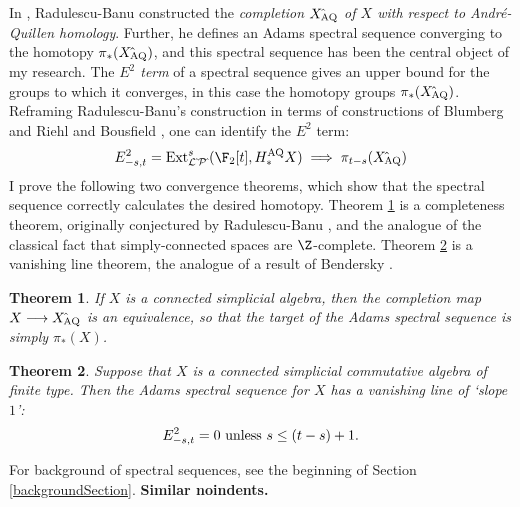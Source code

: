 \documentclass[11pt]{article}
\theoremstyle{plain}
\newtheorem{theorem}{Theorem}
\begin{document}
In \cite{radelescuBanu.pdf}, Radulescu-Banu constructed the \emph{completion $X{\hat{\,}_\textup{\!\!AQ}}$ of $X$ with respect to Andr\'e-Quillen homology}. Further, he defines an Adams spectral sequence converging to the homotopy $\pi_*(X{\hat{\,}_\textup{\!\!AQ}})$, and this spectral sequence has been the central object of my research. The \emph{$E^2$ term} of a spectral sequence gives an upper bound for the groups to which it converges, in this case the homotopy groups $\pi_*(X{\hat{\,}_\textup{\!\!AQ}})$. %
Reframing Radulescu-Banu's construction in terms of constructions of Blumberg and Riehl \cite{BlumRiehlResolutions.pdf} and Bousfield \cite{BousCosimpResnHtpySS.pdf}, one can identify the $E^2$ term:
\[E^2_{-s,t}=\Ext^s_{\calL\hat{\,}\calP\hat{\,}}(\F_2[t],H_*^\textup{AQ}X)\implies \pi_{t-s}(X{\hat{\,}_\textup{\!\!AQ}})\]
I prove the following two convergence theorems, which show that the spectral sequence correctly calculates the desired homotopy. Theorem \ref{completenesstheorem} is a completeness theorem, originally conjectured by Radulescu-Banu \cite[\S1.6.4]{radelescuBanu.pdf}, and the analogue of the classical fact that simply-connected spaces are $\Z$-complete. Theorem \ref{vanishing-line-theorem} is a vanishing line theorem, the analogue of a result of Bendersky \cite{BenderskySomeCalculations.pdf}.
\begin{theorem}\label{completenesstheorem}
If $X$ is a connected simplicial algebra, then the completion map $X\to X{\hat{\,}_\textup{\!\!AQ}}$ is an equivalence, so that the target of the Adams spectral sequence is simply $\pi_*(X)$.
\end{theorem}
\begin{theorem}\label{vanishing-line-theorem}
Suppose that $X$ is a connected simplicial commutative algebra of finite type. Then the Adams spectral sequence for $X$ has a vanishing line of `slope $1$':
\[E^2_{-s,t}=0\textup{\ unless $s\leq (t-s)+1$}.\]
\end{theorem}
\noindent For background of spectral sequences, see the beginning of Section \ref{backgroundSection}. \textbf{Similar noindents.}
\end{document}
